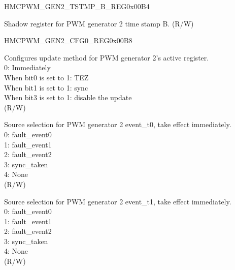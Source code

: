 \begin{register}{H}{MCPWM\_GEN2\_TSTMP\_B\_REG}{0x00B4}\label{regdesc:MCPWMGEN2TSTMPBREG}
%
%
\regnewline%
\begin{regdesc}\begin{reglist}
\label{fielddesc:MCPWMGEN2B}\item [MCPWM\_GEN2\_B] Shadow register for PWM generator 2 time stamp B. (R/W)
\end{reglist}\end{regdesc}
\end{register}


\begin{register}{H}{MCPWM\_GEN2\_CFG0\_REG}{0x00B8}\label{regdesc:MCPWMGEN2CFG0REG}
%
%
%
%
\regnewline%
\begin{regdesc}\begin{reglist}
\label{fielddesc:MCPWMGEN2CFGUPMETHOD}\item [MCPWM\_GEN2\_CFG\_UPMETHOD] Configures update method for PWM generator 2's active register. 
\\0: Immediately 
\\When bit0 is set to 1: TEZ 
\\When bit1 is set to 1: sync
\\When bit3 is set to 1: disable the update 
\\(R/W)
\label{fielddesc:MCPWMGEN2T0SEL}\item [MCPWM\_GEN2\_T0\_SEL] Source selection for PWM generator 2 event\_t0, take effect immediately. \\
0: fault\_event0 \\
1: fault\_event1 \\
2: fault\_event2 \\
3: sync\_taken \\
4: None \\
(R/W)
\label{fielddesc:MCPWMGEN2T1SEL}\item [MCPWM\_GEN2\_T1\_SEL] Source selection for PWM generator 2 event\_t1, take effect immediately. \\
0: fault\_event0 \\
1: fault\_event1 \\
2: fault\_event2 \\
3: sync\_taken \\
4: None \\
(R/W)
\end{reglist}\end{regdesc}
\end{register}


